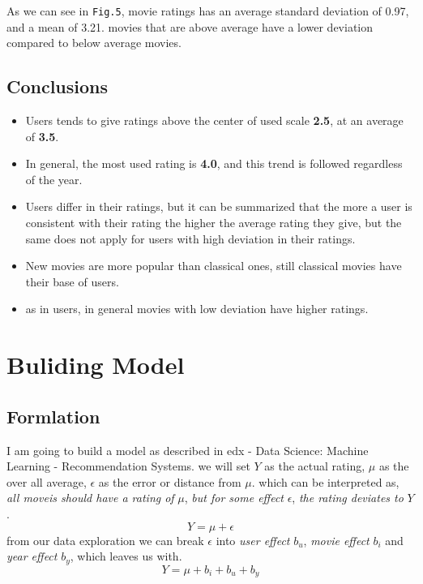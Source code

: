 \documentclass[]{article}
\providecommand{\tightlist}{%
  \setlength{\itemsep}{0pt}\setlength{\parskip}{0pt}}
\begin{document}
As we can see in \texttt{Fig.5}, movie ratings has an average standard
deviation of 0.97, and a mean of 3.21. movies that are above average
have a lower deviation compared to below average movies.

\subsection{Conclusions}\label{conclusions}

\begin{itemize}
\tightlist
\item
  Users tends to give ratings above the center of used scale
  \textbf{2.5}, at an average of \textbf{3.5}.
\item
  In general, the most used rating is \textbf{4.0}, and this trend is
  followed regardless of the year.
\item
  Users differ in their ratings, but it can be summarized that the more
  a user is consistent with their rating the higher the average rating
  they give, but the same does not apply for users with high deviation
  in their ratings.
\item
  New movies are more popular than classical ones, still classical
  movies have their base of users.
\item
  as in users, in general movies with low deviation have higher ratings.
\end{itemize}

\newpage

\section{Buliding Model}\label{buliding-model}

\subsection{Formlation}\label{formlation}

I am going to build a model as described in edx - Data Science: Machine
Learning - Recommendation Systems. we will set \(Y\) as the actual
rating, \(\mu\) as the over all average, \(\epsilon\) as the error or
distance from \(\mu\). which can be interpreted as, \emph{all moveis
should have a rating of} \(\mu\), \emph{but for some effect}
\(\epsilon\), \emph{the rating deviates to} \(Y\).
\[Y = \mu + \epsilon \] from our data exploration we can break
\(\epsilon\) into \emph{user effect} \(b_u\), \emph{movie effect}
\(b_i\) and \emph{year effect} \(b_y\), which leaves us with. \[
Y= \mu + b_i + b_u + b_y 
\]
\end{document}
